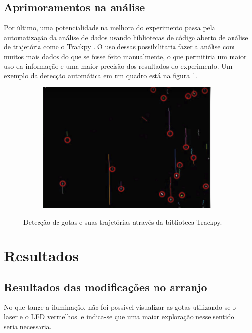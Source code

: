 \documentclass[twoside, twocolumn]{article}
\begin{document}
\subsection{Aprimoramentos na análise}

Por último, uma potencialidade na melhora do experimento passa pela automatização da análise de dados usando bibliotecas de código aberto de análise de trajetória como o Trackpy \cite{trackpy}. O uso dessas possibilitaria fazer a análise com muitos mais dados do que se fosse feito manualmente, o que permitiria um maior uso da informação e uma maior precisão dos resultados do experimento. Um exemplo da detecção automática em um quadro está na figura \ref{fig:trackpy}.

\begin{figure}[h]
	\centering
    \begin{subfigure}[b]{0.8\linewidth}
    	\includegraphics[width = \linewidth]{tracking}
    \end{subfigure}
    \caption{Detecção de gotas e suas trajetórias através da biblioteca Trackpy.}
    \label{fig:trackpy}
\end{figure}

\section{Resultados}

\subsection{Resultados das modificações no arranjo}

No que tange a iluminação, não foi possível visualizar as gotas utilizando-se o laser e o LED vermelhos, e indica-se que uma maior exploração nesse sentido seria necessaria.
\end{document}
